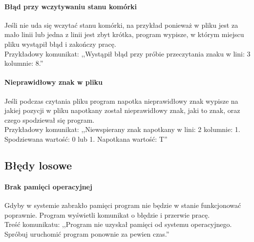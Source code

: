 \documentclass{report}
\begin{document}
 \paragraph{Błąd przy wczytywaniu stanu komórki}
 Jeśli nie uda się wczytać stanu komórki, na przykład ponieważ w pliku jest za mało linii lub jedna z linii jest zbyt krótka, program wypisze, w którym miejscu pliku wystąpił błąd i zakończy pracę. \\
 Przykładowy komunikat: ,,Wystąpił błąd przy próbie przeczytania znaku w lini: 3 kolumnie: 8.''
 
 \paragraph{Nieprawidłowy znak w pliku}
 Jeśli podczas czytania pliku program napotka nieprawidłowy znak wypisze na jakiej pozycji w pliku napotkany został nieprawidłowy znak, jaki to znak, oraz czego spodziewał się program. \\
 Przykładowy komunikat: ,,Niewspierany znak napotkany w lini: 2 kolumnie: 1. Spodziewana wartość: 0 lub 1. Napotkana wartość: T''

\subsection{Błędy losowe}
\paragraph{Brak pamięci operacyjnej}
Gdyby w systemie zabrakło pamięci program nie będzie w stanie funkcjonować poprawnie. Program wyświetli komunikat o błędzie i przerwie pracę. \\
Treść komunikatu: ,,Program nie uzyskał pamięci od systemu operacyjnego. Spróbuj uruchomić program ponownie za pewien czas.''
\end{document}
